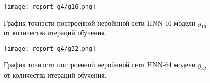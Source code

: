 \documentclass[a4paper,12pt,twoside]{article}
\begin{document}
		\begin{figure}[htb!]
		\texttt{[image: report\_g4/g16.png]}
		
		График точности построенной неройнной сети HNN-16 модели $g_{16}$ от количества итераций обучения.
		
	\end{figure}

	\begin{figure}[htb!]
	\texttt{[image: report\_g4/g32.png]}
	
	График точности построенной неройнной сети HNN-64 модели $g_{32}$ от количества итераций обучения.
	
\end{figure}

		
\end{document}
